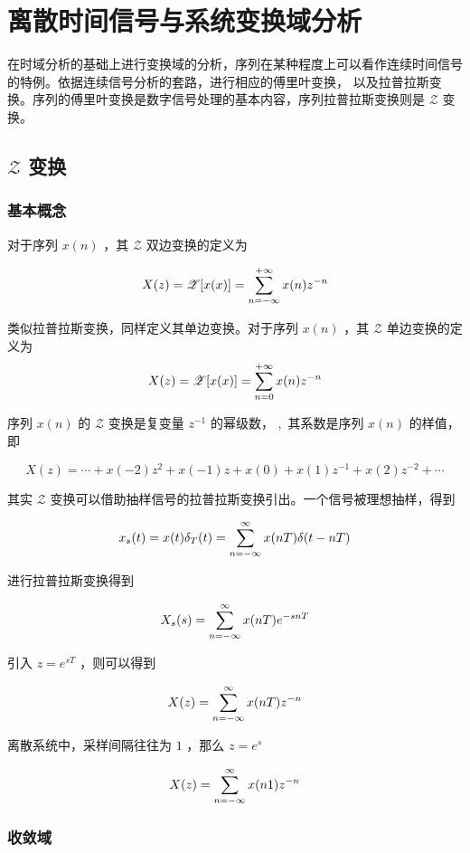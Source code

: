 \documentclass[cn,11pt,chinese,black,simple]{../elegantbook}
\begin{document}
\fi 

\chapter{离散时间信号与系统变换域分析}

在时域分析的基础上进行变换域的分析，序列在某种程度上可以看作连续时间信号的特例。依据连续信号分析的套路，进行相应的傅里叶变换，
以及拉普拉斯变换。序列的傅里叶变换是数字信号处理的基本内容，序列拉普拉斯变换则是 \(\mathscr{Z}\)  变换。


\section{\(\mathscr{Z}\) 变换}

\subsection{基本概念}

\begin{definition}[\(\mathscr{Z}\) 变换]
    对于序列 \(x(n)\) ，其 \(\mathscr{Z}\) 双边变换的定义为 
    
    \[X(z) = \mathscr{Z}[x(x)] = \displaystyle\sum_{n=-\infty}^{+\infty} x(n)z^{-n}\]

    类似拉普拉斯变换，同样定义其单边变换。对于序列 \(x(n)\) ，其 \(\mathscr{Z}\) 单边变换的定义为 
    \[X(z) = \mathscr{Z}[x(x)] = \displaystyle\sum_{n=0}^{+\infty} x(n)z^{-n}\]
\end{definition}

序列 \(x(n)\) 的 \(\mathscr{Z}\) 变换是复变量 \(z^{-1}\) 的幂级数， \(,\) 其系数是序列 \(x(n)\) 的样值， 即

\[
X(z)=\cdots+x(-2) z^{2}+x(-1) z+x(0)+x(1) z^{-1}+x(2) z^{-2}+\cdots
\]

其实 \(\mathscr{Z}\) 变换可以借助抽样信号的拉普拉斯变换引出。一个信号被理想抽样，得到 

\[x_s(t) = x(t) \delta_T(t) = \displaystyle\sum_{n=-\infty}^\infty x(nT) \delta(t-nT)\]

进行拉普拉斯变换得到

\[X_s(s) = \displaystyle\sum_{n=-\infty}^\infty x(nT) e^{-s n T}\]

引入 \(z = e^{s T}\) ，则可以得到

\[X(z) = \displaystyle\sum_{n=-\infty}^\infty x(n T) z^{-n}\]

离散系统中，采样间隔往往为 \(1\) ，那么 \(z = e^s\)

\[X(z) = \displaystyle\sum_{n=-\infty}^\infty x(n 1) z^{-n}\]

\subsection{收敛域}
\end{document}
